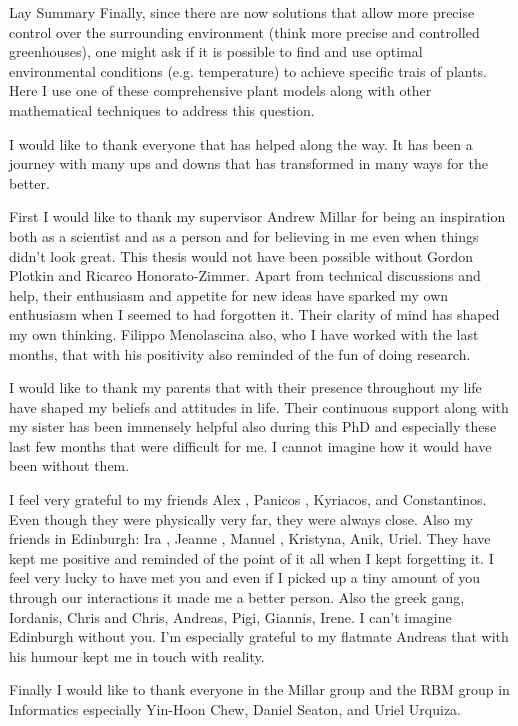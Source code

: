 \documentclass[phd, logo, twoside]{infthesis}
\newcommand{\eg}{e.g.\xspace}
\begin{document}
\begin{preliminary}
\begin{frontenv}{Lay Summary}{\LARGE}
    Finally, since there are now solutions that allow more precise control over
    the surrounding environment (think more precise and controlled greenhouses),
    one might ask if it is possible to find and use optimal environmental
    conditions (\eg temperature) to achieve specific trais of plants. Here I use
    one of these comprehensive plant models along with other mathematical
    techniques to address this question.
\end{frontenv}\newpage

  \begin{acknowledgements}
I would like to thank everyone that has helped along the way. It has been a
journey with many ups and downs that has transformed in many ways for the better.

First I would like to thank my supervisor Andrew Millar for being an inspiration
both as a scientist and as a person and for believing in me even when things
didn't look great. This thesis would not have been possible without Gordon
Plotkin and Ricarco Honorato-Zimmer. Apart from technical discussions and help,
their enthusiasm and appetite for new ideas have sparked my own enthusiasm when
I seemed to had forgotten it. Their clarity of mind has shaped my own
thinking. Filippo Menolascina also, who I have worked with the last months, that
with his positivity also reminded of the fun of doing research.

I would like to thank my parents that with their presence throughout my life
have shaped my beliefs and attitudes in life. Their continuous support along
with my sister has been immensely helpful also during this PhD and especially
these last few months that were difficult for me. I cannot imagine how it would
have been without them.

I feel very grateful to my friends Alex , Panicos , Kyriacos, and
Constantinos. Even though they were physically very far, they were always
close. Also my friends in Edinburgh: Ira , Jeanne , Manuel , Kristyna, Anik,
Uriel. They have kept me positive and reminded of the point of it all when I
kept forgetting it. I feel very lucky to have met you and even if I picked up a
tiny amount of you through our interactions it made me a better person. Also the
greek gang, Iordanis, Chris and Chris, Andreas, Pigi, Giannis, Irene. I can't
imagine Edinburgh without you. I'm especially grateful to my flatmate Andreas
that with his humour kept me in touch with reality.

Finally I would like to thank everyone in the Millar group and the RBM group in
Informatics especially Yin-Hoon Chew, Daniel Seaton, and Uriel Urquiza.


\end{acknowledgements}
\end{preliminary}
\end{document}
